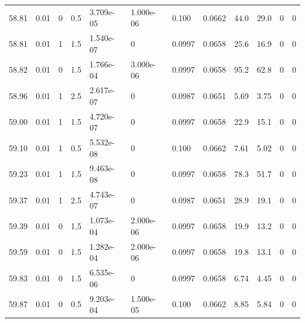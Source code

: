 \documentclass[preview]{standalone}
\begin{document}
{{{{{{{{{{{{{\begin{tabular}{L{1.2cm}C{1.2cm} C{0.3cm}C{0.5cm} C{1.4cm}C{1.4cm} C{1.4cm}C{1.4cm} C{1.6cm}C{1.6cm} C{1.6cm}C{1.6cm}}
  58.81  &  0.01  & 0     & 0.5 &  3.709e-05  & 1.000e-06  &  0.100&   0.0662& 44.0 & 29.0   &  0 & 0  \\ 
  58.81  &  0.01  & 1     & 1.5 &  1.540e-07  & 0  &  0.0997&   0.0658& 25.6 & 16.9   &  0 & 0  \\ 
  58.82  &  0.01  & 0     & 1.5 &  1.766e-04  & 3.000e-06  &  0.0997&   0.0658& 95.2 & 62.8   &  0 & 0  \\ 
  58.96  &  0.01  & 1     & 2.5 &  2.617e-07  & 0  &  0.0987&   0.0651& 5.69 & 3.75   &  0 & 0  \\ 
  59.00  &  0.01  & 1     & 1.5 &  4.720e-07  & 0  &  0.0997&   0.0658& 22.9 & 15.1   &  0 & 0  \\ 
  59.10  &  0.01  & 1     & 0.5 &  5.532e-08  & 0  &  0.100&   0.0662& 7.61 & 5.02   &  0 & 0  \\ 
  59.23  &  0.01  & 1     & 1.5 &  9.463e-08  & 0  &  0.0997&   0.0658& 78.3 & 51.7   &  0 & 0  \\ 
  59.37  &  0.01  & 1     & 2.5 &  4.743e-07  & 0  &  0.0987&   0.0651& 28.9 & 19.1   &  0 & 0  \\ 
  59.39  &  0.01  & 0     & 1.5 &  1.073e-04  & 2.000e-06  &  0.0997&   0.0658& 19.9 & 13.2   &  0 & 0  \\ 
  59.59  &  0.01  & 0     & 1.5 &  1.282e-04  & 2.000e-06  &  0.0997&   0.0658& 19.8 & 13.1   &  0 & 0  \\ 
  59.83  &  0.01  & 0     & 1.5 &  6.535e-06  & 0  &  0.0997&   0.0658& 6.74 & 4.45   &  0 & 0  \\ 
  59.87  &  0.01  & 0     & 0.5 &  9.203e-04  & 1.500e-05  &  0.100&   0.0662& 8.85 & 5.84   &  0 & 0  \\ 
\hline 
\end{tabular} 

}}}}}}}}}}}}}
\end{document}
